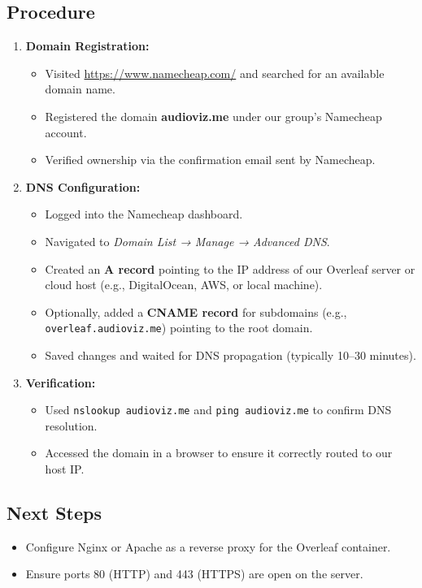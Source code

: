 \subsection{Procedure}
\begin{enumerate}
    \item \textbf{Domain Registration:}
    \begin{itemize}
        \item Visited \url{https://www.namecheap.com/} and searched for an available domain name.
        \item Registered the domain \textbf{audioviz.me} under our group’s Namecheap account.
        \item Verified ownership via the confirmation email sent by Namecheap.
    \end{itemize}

    \item \textbf{DNS Configuration:}
    \begin{itemize}
        \item Logged into the Namecheap dashboard.
        \item Navigated to \textit{Domain List → Manage → Advanced DNS}.
        \item Created an \textbf{A record} pointing to the IP address of our Overleaf server or cloud host (e.g., DigitalOcean, AWS, or local machine).
        \item Optionally, added a \textbf{CNAME record} for subdomains (e.g., \texttt{overleaf.audioviz.me}) pointing to the root domain.
        \item Saved changes and waited for DNS propagation (typically 10–30 minutes).
    \end{itemize}

    \item \textbf{Verification:}
    \begin{itemize}
        \item Used \texttt{nslookup audioviz.me} and \texttt{ping audioviz.me} to confirm DNS resolution.
        \item Accessed the domain in a browser to ensure it correctly routed to our host IP.
    \end{itemize}
\end{enumerate}

\subsection{Next Steps}
\begin{itemize}
    \item Configure Nginx or Apache as a reverse proxy for the Overleaf container.
    \item Ensure ports 80 (HTTP) and 443 (HTTPS) are open on the server.
\end{itemize}

